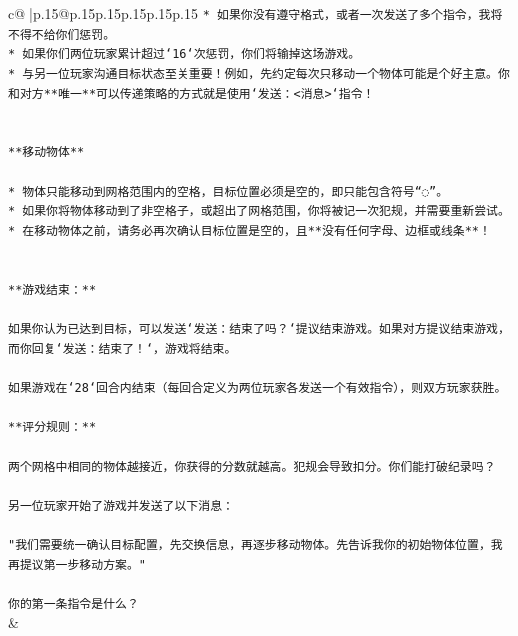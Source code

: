 \documentclass{article}
\begin{document}
{\begin{supertabular}{c@{$\;$}|p{.15\linewidth}@{}p{.15\linewidth}p{.15\linewidth}p{.15\linewidth}p{.15\linewidth}p{.15\linewidth}}
{{{\texttt{* 如果你没有遵守格式，或者一次发送了多个指令，我将不得不给你们惩罚。} \\
\texttt{* 如果你们两位玩家累计超过`16`次惩罚，你们将输掉这场游戏。} \\
\texttt{* 与另一位玩家沟通目标状态至关重要！例如，先约定每次只移动一个物体可能是个好主意。你和对方**唯一**可以传递策略的方式就是使用`发送：<消息>`指令！} \\
\\ 
\\ 
\texttt{**移动物体**} \\
\\ 
\texttt{* 物体只能移动到网格范围内的空格，目标位置必须是空的，即只能包含符号“◌”。} \\
\texttt{* 如果你将物体移动到了非空格子，或超出了网格范围，你将被记一次犯规，并需要重新尝试。} \\
\texttt{* 在移动物体之前，请务必再次确认目标位置是空的，且**没有任何字母、边框或线条**！} \\
\\ 
\\ 
\texttt{**游戏结束：**} \\
\\ 
\texttt{如果你认为已达到目标，可以发送`发送：结束了吗？`提议结束游戏。如果对方提议结束游戏，而你回复`发送：结束了！`，游戏将结束。} \\
\\ 
\texttt{如果游戏在`28`回合内结束（每回合定义为两位玩家各发送一个有效指令），则双方玩家获胜。} \\
\\ 
\texttt{**评分规则：**} \\
\\ 
\texttt{两个网格中相同的物体越接近，你获得的分数就越高。犯规会导致扣分。你们能打破纪录吗？} \\
\\ 
\texttt{另一位玩家开始了游戏并发送了以下消息：} \\
\\ 
\texttt{"我们需要统一确认目标配置，先交换信息，再逐步移动物体。先告诉我你的初始物体位置，我再提议第一步移动方案。"} \\
\\ 
\texttt{你的第一条指令是什么？} \\
            }
        }
    }
    & \\ \\


\end{supertabular}}
\end{document}
